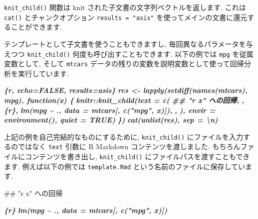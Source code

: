 \documentclass[
  11pt,
]{bxjsreport}
\newenvironment{Shaded}{\begin{snugshade}}{\end{snugshade}}
\newcommand{\FunctionTok}[1]{\textcolor[rgb]{0.00,0.00,0.00}{#1}}
\newcommand{\InformationTok}[1]{\textcolor[rgb]{0.56,0.35,0.01}{\textbf{\textit{#1}}}}
\begin{document}
\texttt{knit\_child()} 関数は knit された子文書の文字列ベクトルを返します. これは \texttt{cat()} とチャンクオプション \texttt{results = "asis"} を使ってメインの文書に還元することができます.

テンプレートとして子文書を使うこともできますし, 毎回異なるパラメータを与えつつ \texttt{knit\_child()} 何度も呼び出すこともできます. 以下の例では \texttt{mpg} を従属変数として, そして \texttt{mtcars} データの残りの変数を説明変数として使って回帰分析を実行しています.

\begin{Shaded}
\begin{Highlighting}[]
\InformationTok{\textasciigrave{}\textasciigrave{}\textasciigrave{}\{r, echo=FALSE, results=\textquotesingle{}asis\textquotesingle{}\}}
\InformationTok{res \textless{}{-} lapply(setdiff(names(mtcars), \textquotesingle{}mpg\textquotesingle{}), function(x) \{}
\InformationTok{  knitr::knit\_child(text = c(}
\InformationTok{    \textquotesingle{}\#\# "\textasciigrave{}r x\textasciigrave{}" への回帰\textquotesingle{},}
\InformationTok{    \textquotesingle{}\textquotesingle{},}
\InformationTok{    \textquotesingle{}\textasciigrave{}\textasciigrave{}\textasciigrave{}\{r\}\textquotesingle{},}
\InformationTok{    \textquotesingle{}lm(mpg \textasciitilde{} ., data = mtcars[, c("mpg", x)])\textquotesingle{},}
\InformationTok{    \textquotesingle{}\textasciigrave{}\textasciigrave{}\textasciigrave{}\textquotesingle{},}
\InformationTok{    \textquotesingle{}\textquotesingle{}}
\InformationTok{  ), envir = environment(), quiet = TRUE)}
\InformationTok{\})}
\InformationTok{cat(unlist(res), sep = \textquotesingle{}\textbackslash{}n\textquotesingle{})}
\InformationTok{\textasciigrave{}\textasciigrave{}\textasciigrave{}}
\end{Highlighting}
\end{Shaded}

上記の例を自己完結的なものにするために, \texttt{knit\_child()} にファイルを入力するのではなく \texttt{text} 引数に R Markdown コンテンツを渡しました. もちろんファイルにコンテンツを書き出し, \texttt{knit\_child()} にファイルパスを渡すこともできます. 例えば以下の例では \texttt{template.Rmd} という名前のファイルに保存しています.

\begin{Shaded}
\begin{Highlighting}[]
\FunctionTok{\#\# "\textasciigrave{}r x\textasciigrave{}" への回帰}

\InformationTok{\textasciigrave{}\textasciigrave{}\textasciigrave{}\{r\}}
\InformationTok{lm(mpg \textasciitilde{} ., data = mtcars[, c("mpg", x)])}
\InformationTok{\textasciigrave{}\textasciigrave{}\textasciigrave{}}
\end{Highlighting}
\end{Shaded}
\end{document}
